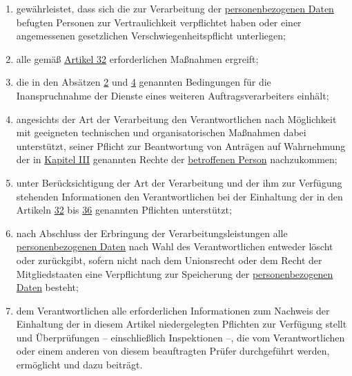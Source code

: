 \begin{enumerate}
\begin{enumerate}
    \item gewährleistet, dass sich die zur Verarbeitung der \hyperref[itm:04-1]{personenbezogenen Daten} befugten Personen zur
     Vertraulichkeit verpflichtet haben oder einer angemessenen gesetzlichen Verschwiegenheitspflicht unterliegen;
    \label{itm:28-3-1b}

    \item alle gemäß \hyperref[ch:32]{Artikel 32} erforderlichen Maßnahmen ergreift;
    \label{itm:28-3-1c}

    \item die in den Absätzen \hyperref[itm:28-2]{2} und \hyperref[itm:28-4]{4} genannten Bedingungen für die
     Inanspruchnahme der Dienste eines weiteren Auftragsverarbeiters einhält;
    \label{itm:28-3-1d}

    \item angesichts der Art der Verarbeitung den Verantwortlichen nach Möglichkeit mit geeigneten technischen und
     organisatorischen Maßnahmen dabei unterstützt, seiner Pflicht zur Beantwortung von Anträgen auf Wahrnehmung der in
     \hyperref[part:3]{Kapitel III} genannten Rechte der \hyperref[itm:04-1]{betroffenen Person} nachzukommen;
    \label{itm:28-3-1e}

    \item unter Berücksichtigung der Art der Verarbeitung und der ihm zur Verfügung stehenden Informationen den
     Verantwortlichen bei der Einhaltung der in den Artikeln \hyperref[ch:32]{32} bis \hyperref[ch:36]{36} genannten
     Pflichten unterstützt;
    \label{itm:28-3-1f}

    \item nach Abschluss der Erbringung der Verarbeitungsleistungen alle \hyperref[itm:04-1]{personenbezogenen Daten} nach Wahl des
     Verantwortlichen entweder löscht oder zurückgibt, sofern nicht nach dem Unionsrecht oder dem Recht der
     Mitgliedstaaten eine Verpflichtung zur Speicherung der \hyperref[itm:04-1]{personenbezogenen Daten} besteht;
    \label{itm:28-3-1g}

    \item dem Verantwortlichen alle erforderlichen Informationen zum Nachweis der Einhaltung der in diesem Artikel
     niedergelegten Pflichten zur Verfügung stellt und Überprüfungen -- einschließlich Inspektionen –, die vom
     Verantwortlichen oder einem anderen von diesem beauftragten Prüfer durchgeführt werden, ermöglicht und dazu
     beiträgt.
    \label{itm:28-3-1h}

  \end{enumerate}


\end{enumerate}
